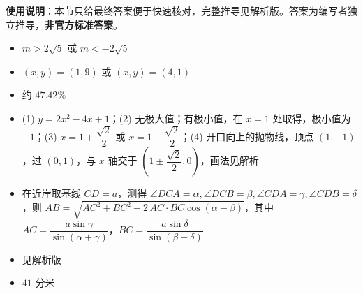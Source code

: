 
\begin{gknotice}
\textbf{使用说明}：本节只给最终答案便于快速核对，完整推导见解析版。答案为编写者独立推导，\textbf{非官方标准答案}。
\end{gknotice}

\begin{itemize}[leftmargin=2.6em]
  \item[\textbf{1.}] $m>2\sqrt5$ 或 $m<-2\sqrt5$
  \item[\textbf{2.}] $(x,y)=(1,9)$ 或 $(x,y)=(4,1)$
  \item[\textbf{3.}] 约 $47.42\%$
  \item[\textbf{4.}] (1) $y=2x^2-4x+1$；(2) 无极大值；有极小值，在 $x=1$ 处取得，极小值为 $-1$；(3) $x=1+\dfrac{\sqrt2}{2}$ 或 $x=1-\dfrac{\sqrt2}{2}$；(4) 开口向上的抛物线，顶点 $(1,-1)$，过 $(0,1)$，与 $x$ 轴交于 $\left(1\pm\dfrac{\sqrt2}{2},0\right)$，画法见解析
  \item[\textbf{5.}] 在近岸取基线 $CD=a$，测得 $\angle DCA=\alpha,\angle DCB=\beta,\angle CDA=\gamma,\angle CDB=\delta$，则 $AB=\sqrt{AC^2+BC^2-2\,AC\cdot BC\cos(\alpha-\beta)}$，其中 $AC=\dfrac{a\sin\gamma}{\sin(\alpha+\gamma)}$，$BC=\dfrac{a\sin\delta}{\sin(\beta+\delta)}$
  \item[\textbf{6.}] 见解析版
  \item[\textbf{7.}] $41$ 分米
\end{itemize}
